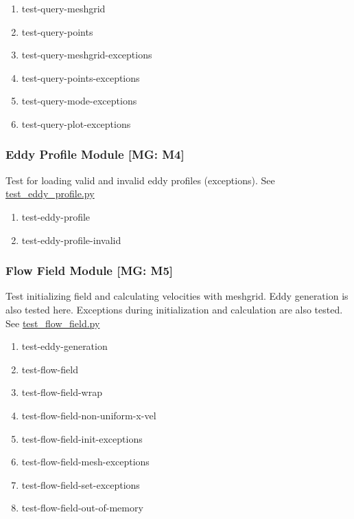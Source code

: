\documentclass[12pt, titlepage]{article}
\begin{document}
\begin{enumerate}
  \item test-query-meshgrid
  \item test-query-points
  \item test-query-meshgrid-exceptions
  \item test-query-points-exceptions
  \item test-query-mode-exceptions
  \item test-query-plot-exceptions
\end{enumerate}

\subsubsection{Eddy Profile Module [MG: M4]} \label{UT:Prof}
Test for loading valid and invalid eddy profiles (exceptions). See \href{https://github.com/omltcat/turbulent-flow/blob/main/test/test_eddy_profile.py}{test\_eddy\_profile.py}

\begin{enumerate}
  \item test-eddy-profile
  \item test-eddy-profile-invalid
\end{enumerate}

\subsubsection{Flow Field Module [MG: M5]} \label{UT:Field}
Test initializing field and calculating velocities with meshgrid. Eddy generation is also tested here. Exceptions during initialization and calculation are also tested. See \href{https://github.com/omltcat/turbulent-flow/blob/main/test/test_flow_field.py}{test\_flow\_field.py}

\begin{enumerate}
  \item test-eddy-generation
  \item test-flow-field
  \item test-flow-field-wrap
  \item test-flow-field-non-uniform-x-vel
  \item test-flow-field-init-exceptions
  \item test-flow-field-mesh-exceptions
  \item test-flow-field-set-exceptions
  \item test-flow-field-out-of-memory
\end{enumerate}
\end{document}
